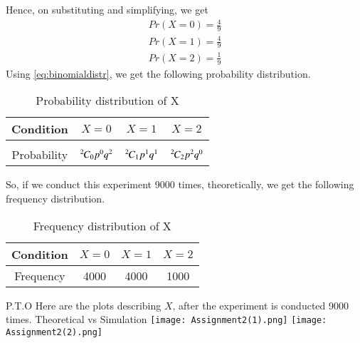 \documentclass[journal,12pt,twocolumn]{IEEEtran}
\begin{document}
\newline
Hence, on substituting and simplifying, we get
\begin{align}
    \tag{5.25.6}
    Pr(X=0)=\frac{4}{9}\\
    \tag{5.25.7}
    Pr(X=1)=\frac{4}{9}\\
    \tag{5.25.8}
    Pr(X=2)=\frac{1}{9}
\end{align}
\newline
Using \eqref{eq:binomialdistr}, we get the following probability distribution.
\begin{table}[h!]
\centering
\caption{Probability distribution of X}
\label{table:1}
\begin{tabular}{|c||c|c|c|}
    \hline
    Condition & $X = 0$& $X =1 $& $X=2$ \\
    \hline
    & & &\\
    Probability & ${{}^{2}\mkern-1muC_{0}}p^{0}q^{2}$ & ${{}^{2}\mkern-1muC_{1}}p^{1}q^{1}$ & ${{}^{2}\mkern-1muC_{2}}p^{2}q^{0}$\\[1ex]
    \hline
\end{tabular}
\end{table}

So, if we conduct this experiment 9000 times, theoretically, we get the following frequency distribution.

\begin{table}[h!]
\centering
\caption{Frequency distribution of X}
\label{table:2}
\begin{tabular}{|c||c|c|c|}
    \hline
    Condition & $X = 0$& $X =1 $& $X=2$ \\
    \hline
    Frequency & 4000 & 4000 & 1000\\
    \hline
\end{tabular}
\end{table}
P.T.O
\newpage
Here are the plots describing $X$, after the experiment is conducted 9000 times.
\newline
\newline
Theoretical vs Simulation
\newline
\newline
\texttt{[image: Assignment2(1).png]}
\texttt{[image: Assignment2(2).png]}
\end{document}
